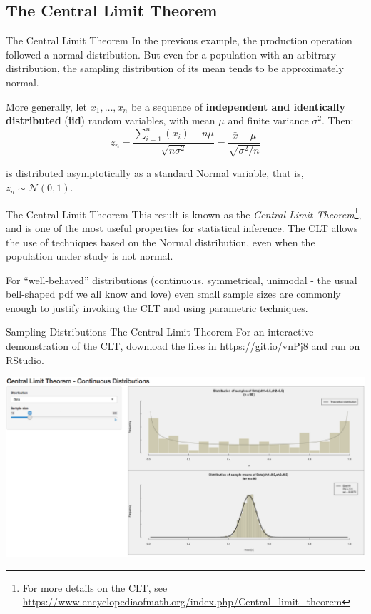 \subsection{The Central Limit Theorem}

\begin{frame}{The Central Limit Theorem}
In the previous example, the production operation followed a normal distribution. But even for a population with an arbitrary distribution, the sampling distribution of its mean tends to be approximately normal.
\bigskip

More generally, let $x_1,\ldots,x_n$ be a sequence of \textbf{independent and identically distributed} (\textbf{iid}) random variables, with mean $\mu$ and finite variance $\sigma^2$. Then:
\begin{equation*}
z_n = \frac{\sum\limits_{i=1}^{n}{(x_i)} - n\mu}{\sqrt{n\sigma^2}} = \frac{\bar{x} - \mu}{\sqrt{\sigma^2/n}}
\end{equation*}

is distributed asymptotically as a standard Normal variable, that is, $z_n\sim\mathcal{N}(0,1)$.
\end{frame}

\begin{frame}
{The Central Limit Theorem}
This result is known as the \textit{Central Limit Theorem}\footnote{For more details on the CLT, see \url{https://www.encyclopediaofmath.org/index.php/Central_limit_theorem}}, and is one of the most useful properties for statistical inference. The CLT allows the use of techniques based on the Normal distribution, even when the population under study is not normal.\bigskip

For ``well-behaved'' distributions (continuous, symmetrical, unimodal - the usual bell-shaped pdf we all know and love) even small sample sizes are commonly enough to justify invoking the CLT and using parametric techniques.\bigskip
\end{frame}

\begin{frame}
{Sampling Distributions}
{The Central Limit Theorem}
For an interactive demonstration of the CLT, download the files in {\small\url{https://git.io/vnPj8}} and run on RStudio.
\bigskip

{\centering\includegraphics[width=\textwidth]{../img/CLTdemo.png}}
\end{frame}

